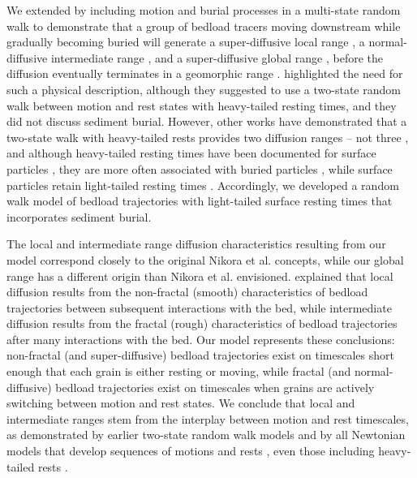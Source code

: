 We extended \citet{Einstein1937} by including motion and burial processes in a multi-state random walk \citep{Weiss1994,Weeks1998} to demonstrate that a group of bedload tracers moving downstream while gradually becoming buried will generate a super-diffusive local range \citep{Martin2012,Fathel2016,Witz2018}, a normal-diffusive intermediate range \citep{Nakagawa1976,Yano1969}, and a super-diffusive global range \citep{Bradley2017, Bradley2010}, before the diffusion eventually terminates in a geomorphic range \citep{Hassan2017}.
\citet{Nikora2002} highlighted the need for such a physical description, although they suggested to use a two-state random walk between motion and rest states with heavy-tailed resting times, and they did not discuss sediment burial.
However, other works have demonstrated that a two-state walk with heavy-tailed rests provides two diffusion ranges -- not three \citep{Weeks1996,Fan2016}, and although heavy-tailed resting times have been documented for surface particles \citep{Liu2019,Fraccarollo2019}, they are more often associated with buried particles \citep{Martin2012,Martin2014,Voepel2013,Olinde2015,Pelosi2016, Pierce2020a}, while surface particles retain light-tailed resting times \citep{Einstein1937,Yano1969,Ancey2006,Nakagawa1976}.
Accordingly, we developed a random walk model of bedload trajectories with light-tailed surface resting times that incorporates sediment burial.

The local and intermediate range diffusion characteristics resulting from our model correspond closely to the original Nikora et al. concepts, while our global range has a different origin than Nikora et al. envisioned.
\citet{Nikora2001a} explained that local diffusion results from the non-fractal (smooth) characteristics of bedload trajectories between subsequent interactions with the bed,  while intermediate diffusion results from the fractal (rough) characteristics of bedload trajectories after many interactions with the bed.
Our model represents these conclusions: non-fractal (and super-diffusive) bedload trajectories exist on timescales short enough that each grain is either resting or moving, while fractal (and normal-diffusive) bedload trajectories exist on timescales when grains are actively switching between motion and rest states.
We conclude that local and intermediate ranges stem from the interplay between motion and rest timescales, as demonstrated by earlier two-state random walk models \citep{Lisle1998,Lajeunesse2017} and by all Newtonian models that develop sequences of motions and rests \citep{Nikora2001a, Bialik2012}, even those including heavy-tailed rests \citep{Fan2016}. 

